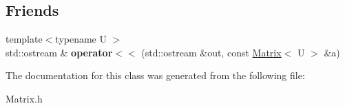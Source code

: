 \subsection*{Friends}
\begin{DoxyCompactItemize}
\item 
\mbox{\label{classcore_1_1_matrix_abe73619c6b45315d7efd6a2074ed71bd}} 
{\footnotesize template$<$typename U $>$ }\\std\+::ostream \& {\bfseries operator$<$$<$} (std\+::ostream \&out, const \mbox{\hyperlink{classcore_1_1_matrix}{Matrix}}$<$ U $>$ \&a)
\end{DoxyCompactItemize}


The documentation for this class was generated from the following file\+:\begin{DoxyCompactItemize}
\item 
Matrix.\+h\end{DoxyCompactItemize}

